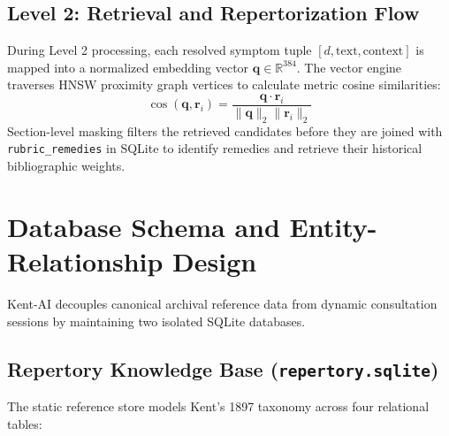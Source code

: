 \subsection{Level 2: Retrieval and Repertorization Flow}
During Level 2 processing, each resolved symptom tuple $[d, \text{text}, \text{context}]$ is mapped into a normalized embedding vector $\mathbf{q} \in \mathbb{R}^{384}$. The vector engine traverses HNSW proximity graph vertices to calculate metric cosine similarities:
$$\cos(\mathbf{q}, \mathbf{r}_i) = \frac{\mathbf{q} \cdot \mathbf{r}_i}{\|\mathbf{q}\|_2 \|\mathbf{r}_i\|_2}$$
Section-level masking filters the retrieved candidates before they are joined with \texttt{rubric\_remedies} in SQLite to identify remedies and retrieve their historical bibliographic weights.


\section{Database Schema and Entity-Relationship Design}

Kent-AI decouples canonical archival reference data from dynamic consultation sessions by maintaining two isolated SQLite databases.

\subsection{Repertory Knowledge Base (\texttt{repertory.sqlite})}
The static reference store models Kent's 1897 taxonomy across four relational tables:

